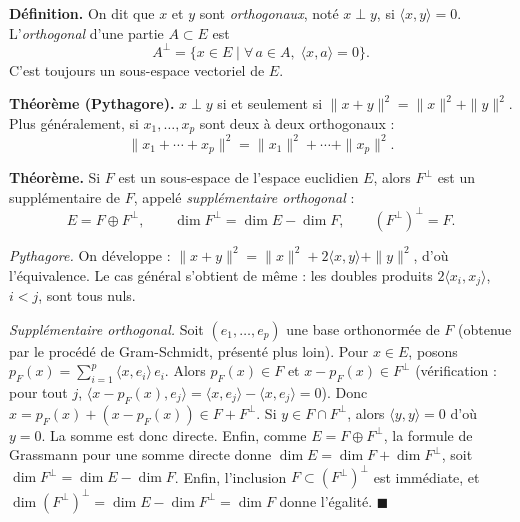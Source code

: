 
\begin{tcolorbox}[thmbox]
  \textbf{Définition.}\enspace%
  On dit que $x$ et $y$ sont \emph{orthogonaux}, noté $x \perp y$, si
  $\langle x,y\rangle = 0$.
  L'\emph{orthogonal} d'une partie $A \subset E$ est
  \[
    A^\perp = \bigl\{x \in E \mid \forall\,a \in A,\;\langle x,a\rangle = 0\bigr\}.
  \]
  C'est toujours un sous-espace vectoriel de $E$.

  \medskip
  \textbf{Théorème (Pythagore).}\enspace%
  $x \perp y$ si et seulement si $\|x+y\|^2 = \|x\|^2 + \|y\|^2$.
  Plus généralement, si $x_1, \ldots, x_p$ sont deux à deux orthogonaux :
  \[
    \|x_1 + \cdots + x_p\|^2 = \|x_1\|^2 + \cdots + \|x_p\|^2.
  \]

  \medskip
  \textbf{Théorème.}\enspace%
  Si $F$ est un sous-espace de l'espace euclidien $E$, alors $F^\perp$
  est un supplémentaire de $F$, appelé \emph{supplémentaire orthogonal} :
  \[
    E = F \oplus F^\perp, \qquad \dim F^\perp = \dim E - \dim F,
    \qquad (F^\perp)^\perp = F.
  \]
\end{tcolorbox}

\begin{mdframed}[style=proofbar]
  \textit{Pythagore.} On développe :
  $\|x+y\|^2 = \|x\|^2 + 2\langle x,y\rangle + \|y\|^2$, d'où l'équivalence.
  Le cas général s'obtient de même : les doubles produits
  $2\langle x_i,x_j\rangle$, $i < j$, sont tous nuls.

  \smallskip
  \textit{Supplémentaire orthogonal.}
  Soit $(e_1,\ldots,e_p)$ une base orthonormée de $F$ (obtenue par le procédé
  de Gram-Schmidt, présenté plus loin). Pour $x \in E$, posons $p_F(x) = \sum_{i=1}^p \langle x, e_i\rangle\, e_i$.
  Alors $p_F(x) \in F$ et $x - p_F(x) \in F^\perp$ (vérification : pour tout $j$,
  $\langle x - p_F(x), e_j\rangle = \langle x,e_j\rangle - \langle x,e_j\rangle = 0$).
  Donc $x = p_F(x) + (x-p_F(x)) \in F + F^\perp$.
  Si $y \in F \cap F^\perp$, alors $\langle y,y\rangle = 0$ d'où $y = 0$.
  La somme est donc directe. Enfin, comme $E = F \oplus F^\perp$, la formule de
  Grassmann pour une somme directe donne $\dim E = \dim F + \dim F^\perp$, soit
  $\dim F^\perp = \dim E - \dim F$.
  Enfin, l'inclusion $F \subset (F^\perp)^\perp$ est immédiate, et
  $\dim (F^\perp)^\perp = \dim E - \dim F^\perp = \dim F$ donne l'égalité.
  $\blacksquare$
\end{mdframed}

